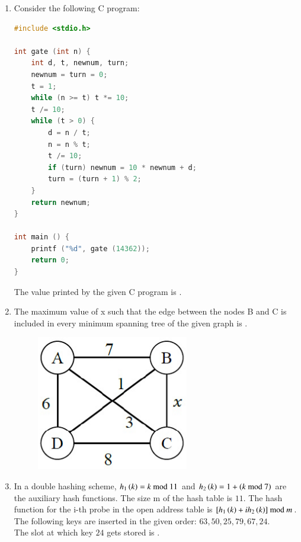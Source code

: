 \documentclass[a4paper, 11pt]{article}
\begin{document}
\begin{enumerate}
    \hfill{}

    \item Consider the following C program:
    \begin{lstlisting}[language=C]
#include <stdio.h>

int gate (int n) {
    int d, t, newnum, turn;
    newnum = turn = 0;
    t = 1;
    while (n >= t) t *= 10;
    t /= 10;
    while (t > 0) {
        d = n / t;
        n = n % t;
        t /= 10;
        if (turn) newnum = 10 * newnum + d;
        turn = (turn + 1) % 2;
    }
    return newnum;
}

int main () {
    printf ("%d", gate (14362));
    return 0;
}
    \end{lstlisting}
    The value printed by the given C program is \underline{\hspace{2cm}}. 

    \hfill{}

    \item The maximum value of x such that the edge between the nodes B and C is included in every minimum spanning tree of the given graph is \underline{\hspace{2cm}}. 
    
    \begin{figure}[H]
        \centering
        \includegraphics[width=0.5\columnwidth]{figs/q64.png}
    \end{figure}

    \hfill{}

    \item In a double hashing scheme, $h_1\left(k\right) = k \text{ mod } 11$ and $h_2\left(k\right) = 1 + \left(k \text{ mod } 7\right)$ are the auxiliary hash functions. The size m of the hash table is $11$. The hash function for the i-th probe in the open address table is $[h_1\left(k\right) + i h_2\left(k\right)] \text{ mod } m$. The following keys are inserted in the given order: $63, 50, 25, 79, 67, 24$.\\The slot at which key $24$ gets stored is \underline{\hspace{2cm}}. 
    \hfill{}

\end{enumerate}
\end{document}
